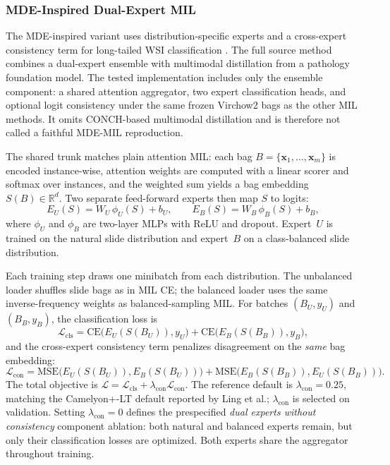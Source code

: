 \documentclass[11pt]{article}
\begin{document}
\subsubsection{MDE-Inspired Dual-Expert MIL}
The MDE-inspired variant uses distribution-specific experts and a cross-expert consistency term for long-tailed WSI classification \citep{ling2025mdeMil}. The full source method combines a dual-expert ensemble with multimodal distillation from a pathology foundation model. The tested implementation includes only the ensemble component: a shared attention aggregator, two expert classification heads, and optional logit consistency under the same frozen Virchow2 bags as the other MIL methods. It omits CONCH-based multimodal distillation and is therefore not called a faithful MDE-MIL reproduction.

The shared trunk matches plain attention MIL: each bag $B=\{\mathbf{x}_1,\ldots,\mathbf{x}_m\}$ is encoded instance-wise, attention weights are computed with a linear scorer and softmax over instances, and the weighted sum yields a bag embedding $S(B)\in\mathbb{R}^{d}$. Two separate feed-forward experts then map $S$ to logits:
\begin{equation}
  E_U(S) = W_U\,\phi_U(S) + b_U,
  \qquad
  E_B(S) = W_B\,\phi_B(S) + b_B,
  \label{eq:mde-experts}
\end{equation}
\noindent where $\phi_U$ and $\phi_B$ are two-layer MLPs with ReLU and dropout. Expert~$U$ is trained on the natural slide distribution and expert~$B$ on a class-balanced slide distribution.

Each training step draws one minibatch from each distribution. The unbalanced loader shuffles slide bags as in MIL CE; the balanced loader uses the same inverse-frequency weights as balanced-sampling MIL. For batches $(B_U,y_U)$ and $(B_B,y_B)$, the classification loss is
\begin{equation}
  \mathcal{L}_{\mathrm{cls}} =
  \mathrm{CE}\bigl(E_U(S(B_U)), y_U\bigr) +
  \mathrm{CE}\bigl(E_B(S(B_B)), y_B\bigr),
  \label{eq:mde-cls}
\end{equation}
\noindent and the cross-expert consistency term penalizes disagreement on the \emph{same} bag embedding:
\begin{equation}
  \mathcal{L}_{\mathrm{con}} =
  \mathrm{MSE}\bigl(E_U(S(B_U)), E_B(S(B_U))\bigr) +
  \mathrm{MSE}\bigl(E_B(S(B_B)), E_U(S(B_B))\bigr).
  \label{eq:mde-con}
\end{equation}
\noindent The total objective is $\mathcal{L}=\mathcal{L}_{\mathrm{cls}}+\lambda_{\mathrm{con}}\mathcal{L}_{\mathrm{con}}$. The reference default is $\lambda_{\mathrm{con}}=\num{0.25}$, matching the Camelyon+-LT default reported by Ling et al.; $\lambda_{\mathrm{con}}$ is selected on validation. Setting $\lambda_{\mathrm{con}}=0$ defines the prespecified \emph{dual experts without consistency} component ablation: both natural and balanced experts remain, but only their classification losses are optimized. Both experts share the aggregator throughout training.
\end{document}
